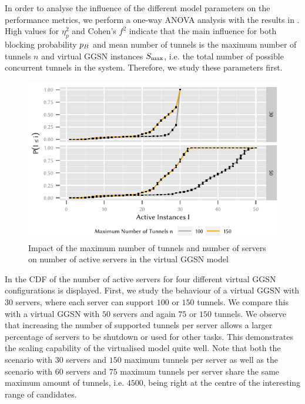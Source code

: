 In order to analyse the influence of the different model parameters on the performance metrics, we perform a one-way ANOVA analysis with the results in .
High values for \(\eta_p^2\) and Cohen's \(f^2\)\cite{Ellis2010} indicate that the main influence for both blocking probability \(p_B\) and mean number of tunnels is the maximum number of tunnels \(n\) and virtual \gls{GGSN} instances \(S_{\max}\), i.e. the total number of possible concurrent tunnels in the system.
Therefore, we study these parameters first.

\begin{figure}
  \centering
  \includegraphics{cloud/virtualized_network_functions/performance_evaluation/figures/instanceuse_multiserver}
  \caption{Impact of the maximum number of tunnels and number of servers on number of active servers in the virtual \gls{GGSN} model}
  \label{fig:cloud:virtualized_network_functions:performance_evaluation:virtual_ggsn:instanceuse_multiserver}
\end{figure}

In  the \gls{CDF} of the number of active servers for four different virtual \gls{GGSN} configurations is displayed.
First, we study the behaviour of a virtual \gls{GGSN} with \(30\) servers, where each server can support \(100\) or \(150\) tunnels.  
We compare this with a virtual \gls{GGSN} with \(50\) servers and again \(75\) or \(150\) tunnels.
We observe that increasing the number of supported tunnels per server allows a larger percentage of servers to be shutdown or used for other tasks. This demonstrates the scaling capability of the virtualised model quite well.
Note that both the scenario with \(30\) servers and \(150\) maximum tunnels per server as well as the scenario with \(60\) servers and \(75\) maximum tunnels per server share the same maximum amount of tunnels, i.e. \(4500\), being right at the centre of the interesting range of candidates.

